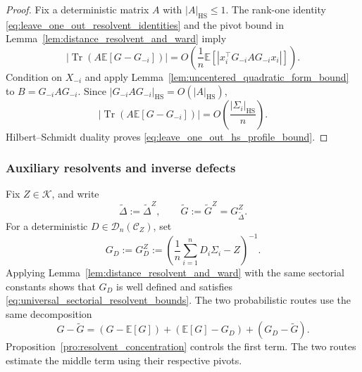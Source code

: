 \documentclass[EJP, preprint, NODS, nobera, nofontexpansion]{ejpecp}
\DeclareMathOperator{\tr}{Tr}
\DeclareMathOperator{\hs}{HS}
\begin{document}
\begin{proof}
Fix a deterministic matrix $A$ with $|A|_{\hs}\leq1$.
The rank-one identity \eqref{eq:leave_one_out_resolvent_identities} and
the pivot bound in Lemma~\ref{lem:distance_resolvent_and_ward} imply
\[
    \left|\tr\!\left(A\mathbb E[G-G_{-i}]\right)\right|
    =O\!\left(
      \frac1n\mathbb E\left[\left|x_i^\top G_{-i}AG_{-i}x_i\right|\right]
    \right).
\]
Condition on $X_{-i}$ and apply
Lemma~\ref{lem:uncentered_quadratic_form_bound} to
$B=G_{-i}AG_{-i}$.  Since
$|G_{-i}AG_{-i}|_{\hs}=O(|A|_{\hs})$,
\[
    \left|\tr\!\left(A\mathbb E[G-G_{-i}]\right)\right|
    = O\left(\frac{|\Sigma_i|_{\hs}}n\right).
\]
Hilbert--Schmidt duality proves
\eqref{eq:leave_one_out_hs_profile_bound}.
\end{proof}


























\subsubsection{Auxiliary resolvents and inverse defects}

Fix \(Z\in\mathcal K\), and write
\[
    \widetilde\Delta:=\widetilde\Delta^Z,
    \qquad
    \widetilde G:=\widetilde G^Z=G_{\widetilde\Delta}^Z.
\]
For a deterministic \(D\in\mathcal D_n(\mathcal C_Z)\), set
\[
    G_D:=G_D^Z
    :=
    \left(
        \frac1n\sum_{i=1}^nD_i\Sigma_i-Z
    \right)^{-1}.
\]
Applying Lemma~\ref{lem:distance_resolvent_and_ward} with the same sectorial
constants shows that $G_D$ is well defined and satisfies
\eqref{eq:universal_sectorial_resolvent_bounds}.
The two probabilistic routes use the same decomposition
\[
    G-\widetilde G
    =
    (G-\mathbb E[G])
    +
    (\mathbb E[G]-G_D)
    +
    (G_D-\widetilde G).
\]
Proposition~\ref{pro:resolvent_concentration} controls the first term.
The two routes estimate the middle term using their respective pivots.
\end{document}
